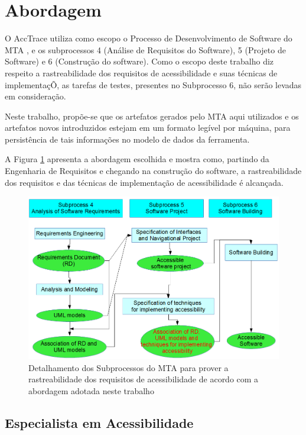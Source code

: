 \documentclass[runningheads,a4paper]{llncs}
\begin{document}
\section{Abordagem}

O AccTrace utiliza como escopo o Processo de Desenvolvimento de Software do MTA
\cite{maia:10}, e os subprocessos 4 (Análise de Requisitos do Software), 5
(Projeto de Software) e 6 (Construção do software). Como o escopo deste trabalho
diz respeito a rastreabilidade dos requisitos de acessibilidade e suas técnicas
de implementaçÕ, as tarefas de testes, presentes no Subprocesso 6, não serão
levadas em consideração. 

Neste trabalho, propõe-se que os artefatos gerados pelo MTA aqui utilizados e os
artefatos novos introduzidos estejam em um formato legível por máquina, para
persistência de tais informações no modelo de dados da ferramenta.

A Figura \ref{fig:figmagica} apresenta a abordagem escolhida e mostra como,
partindo da Engenharia de Requisitos e chegando na construção do software,
a rastreabilidade dos requisitos e das técnicas de implementação de
acessibilidade é alcançada.

\begin{figure}[h!]
\centering
\includegraphics[scale=0.25]{img/figuramagica.png}
\caption{Detalhamento dos Subprocessos do MTA para prover a rastreabilidade dos
requisitos de acessibilidade de acordo com a abordagem adotada neste trabalho}
\label{fig:figmagica}
\end{figure}

\subsection{Especialista em Acessibilidade}
\end{document}
